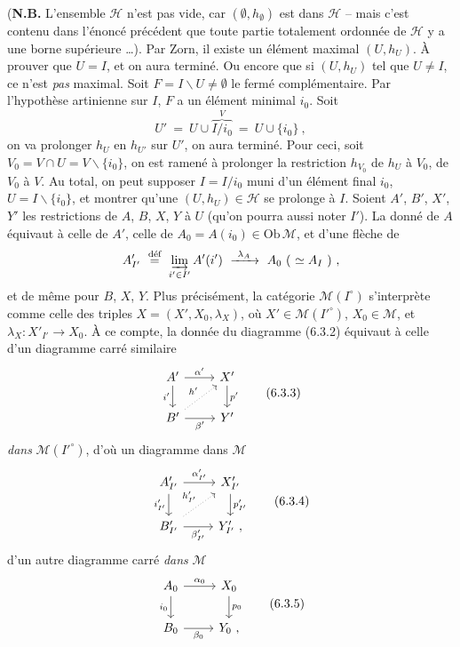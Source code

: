 (\textbf{N.B.} L'ensemble $\mathcal{H}$ n'est pas vide, car $(\emptyset, h_{\emptyset})$ est dans $\mathcal{H}$ -- mais c'est contenu dans l'énoncé précédent que toute partie totalement ordonnée de $\mathcal{H}$ y a une borne supérieure \dots). Par Zorn, il existe un élément maximal $(U, h_U)$. À prouver que $U = I$, et on aura terminé. Ou encore que si $(U, h_U)$ tel que $U \neq I$, ce n'est \textit{pas} maximal. Soit $F = I\backslash U \neq \emptyset$ le fermé complémentaire. Par l'hypothèse artinienne sur $I$, $F$ a un élément minimal $i_0$. Soit
\[
U' \ =\ U \cup \overbrace{I/i_0}^{V} \ =\ U \cup \{i_0\}\ ,
\]
on va prolonger $h_U$ en $h_{U'}$ sur $U'$, on aura terminé. Pour ceci, soit $V_0 = V \cap U = V\backslash\{i_0\}$, on est ramené à prolonger la restriction $h_{V_0}$ de $h_U$ à $V_0$, de $V_0$ à $V$. Au total, on peut supposer $I = I/i_0$ muni d'un élément final $i_0$, $U = I\backslash\{i_0\}$, et montrer qu'une $(U, h_U) \in \mathcal{H}$ se prolonge à $I$. Soient $A'$, $B'$, $X'$, $Y'$ les restrictions de $A$, $B$, $X$, $Y$ à $U$ (qu'on pourra aussi noter $I'$). La donné de $A$ %
équivaut à celle de $A'$, celle de $A_0 = A(i_0) \in \mathrm{Ob}\,\mathcal{M}$, et d'une flèche de
\[
A'_{I'} \ \overset{\text{déf}}{=}\ \varinjlim\limits_{i' \in I'} A'(i') \ \xrightarrow{\ \lambda_A\ }\ A_0\ (\ \simeq A_I\ )\ ,
\]
et de même pour $B$, $X$, $Y$. Plus précisément, la catégorie $\mathcal{M}(I^{\circ})$ s'interprète comme celle des triples $X = (X', X_0, \lambda_X)$, où $X' \in \mathcal{M}(I'^{\circ})$, $X_0 \in \mathcal{M}$, et $\lambda_X : X'_{I'} \longrightarrow X_0$. À ce compte, la donnée du diagramme (6.3.2) équivaut à celle d'un diagramme carré similaire
\[
\begin{tikzcd}
A' \arrow[r, "\alpha'"] \arrow[d, "i'"'] & X' \arrow[d, "p'"] \\
B' \arrow[r, "\beta'"'] \arrow[ur, dotted, "h'"] & Y'
\end{tikzcd}
\tag*{(6.3.3)}
\]
\textit{dans} $\mathcal{M}(I'^{\circ})$, d'où un diagramme dans $\mathcal{M}$
\[
\begin{tikzcd}
A'_{I'} \arrow[r, "\alpha'_{I'}"] \arrow[d, "i'_{I'}"'] & X'_{I'} \arrow[d, "p'_{I'}"] \\
B'_{I'} \arrow[r, "\beta'_{I'}"'] \arrow[ur, dotted, "h'_{I'}"] & Y'_{I'}\ ,
\end{tikzcd}
\tag*{(6.3.4)}
\]
d'un autre diagramme carré \textit{dans} $\mathcal{M}$
\[
\begin{tikzcd}
A_0 \arrow[r, "\alpha_0"] \arrow[d, "i_0"'] & X_0 \arrow[d, "p_0"] \\
B_0 \arrow[r, "\beta_0"'] & Y_0\ ,
\end{tikzcd}
\tag*{(6.3.5)}
\]
